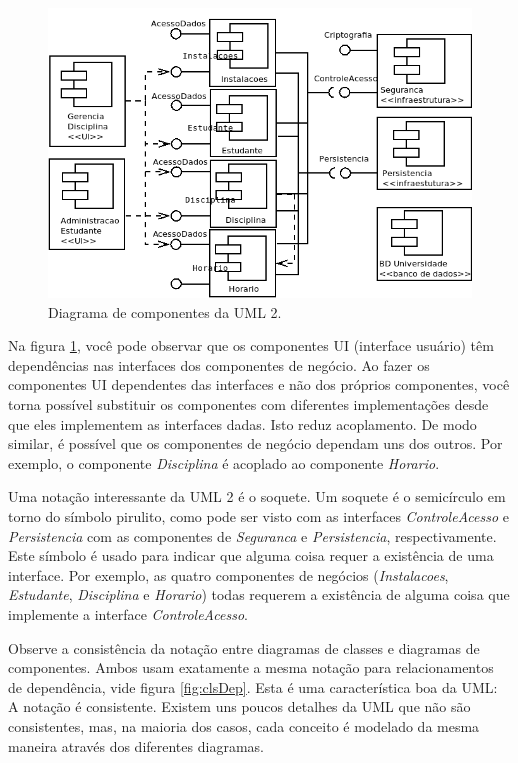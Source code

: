 \begin{figure}
\begin{center}
\includegraphics[scale=0.5]{componente.png}
\end{center}
\caption{Diagrama de componentes da UML 2.} \label{fig:compo}
\end{figure}

Na figura \ref{fig:compo}, você pode observar que os componentes UI (interface usuário) têm dependências nas interfaces dos componentes de negócio. Ao fazer os componentes UI dependentes das interfaces e não dos próprios componentes, você torna possível substituir os componentes com diferentes implementações desde que eles implementem as interfaces dadas. Isto reduz acoplamento. De modo similar, é possível que os componentes de negócio dependam uns dos outros. Por exemplo, o componente \emph{Disciplina} é acoplado ao componente \emph{Horario}. 

Uma notação interessante da UML 2 é o soquete. Um soquete é o semicírculo em torno do símbolo pirulito, como pode ser visto com as interfaces \emph{ControleAcesso} e \emph{Persistencia} com as componentes de \emph{Seguranca} e \emph{Persistencia}, respectivamente. Este símbolo é usado para indicar que alguma coisa requer a existência de uma interface. Por exemplo, as quatro componentes de negócios (\emph{Instalacoes}, \emph{Estudante}, \emph{Disciplina} e \emph{Horario}) todas requerem a existência de alguma coisa que implemente a interface \emph{ControleAcesso}.

Observe a consistência da notação entre diagramas de classes e diagramas de componentes. Ambos usam exatamente a mesma notação para relacionamentos de dependência, vide figura \ref{fig:clsDep}. Esta é uma característica boa da UML: A notação é consistente. Existem uns poucos detalhes da UML que não são consistentes, mas, na maioria dos casos, cada conceito é modelado da mesma maneira através dos diferentes diagramas.

